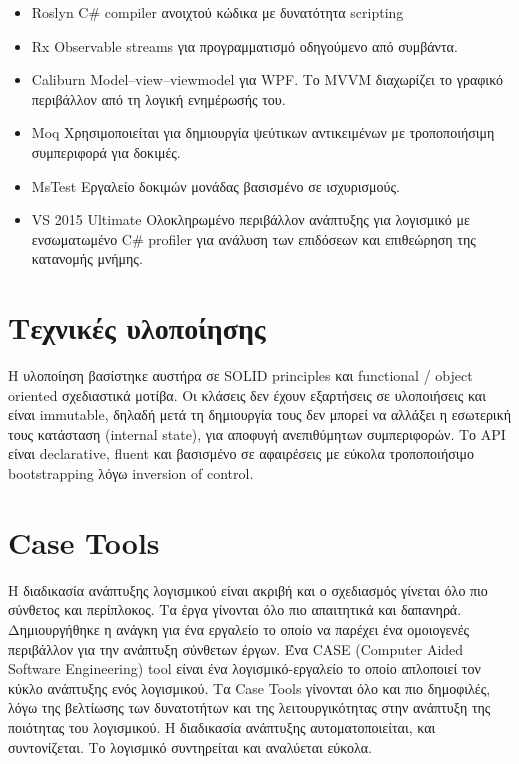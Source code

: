 \begin{itemize}
	\item{Roslyn} C\# compiler ανοιχτού κώδικα με δυνατότητα scripting
	\item{Rx} Observable streams για προγραμματισμό οδηγούμενο από συμβάντα.
	\item{Caliburn} Model–view–viewmodel για WPF. Το MVVM διαχωρίζει το γραφικό περιβάλλον από τη λογική ενημέρωσής του.
	\item{Moq} Χρησιμοποιείται για δημιουργία ψεύτικων αντικειμένων με τροποποιήσιμη συμπεριφορά για δοκιμές.
	\item{MsTest} Εργαλείο δοκιμών μονάδας βασισμένο σε ισχυρισμούς.
	\item{VS 2015 Ultimate} Ολοκληρωμένο περιβάλλον ανάπτυξης για λογισμικό με ενσωματωμένο C\# profiler για ανάλυση των επιδόσεων και επιθεώρηση της κατανομής μνήμης.
\end{itemize}

\section{Τεχνικές υλοποίησης}
Η υλοποίηση βασίστηκε αυστήρα σε SOLID principles και functional / object oriented σχεδιαστικά μοτίβα. Οι κλάσεις δεν έχουν εξαρτήσεις σε υλοποιήσεις και είναι immutable, δηλαδή μετά τη δημιουργία τους δεν μπορεί να αλλάξει η εσωτερική τους κατάσταση (internal state), για αποφυγή ανεπιθύμητων συμπεριφορών. Το API είναι declarative, fluent και βασισμένο σε αφαιρέσεις με εύκολα τροποποιήσιμο bootstrapping λόγω inversion of control.

\section{Case Tools}
Η διαδικασία ανάπτυξης λογισμικού είναι ακριβή και ο σχεδιασμός γίνεται όλο πιο σύνθετος και περίπλοκος. Τα έργα γίνονται όλο πιο απαιτητικά και δαπανηρά. Δημιουργήθηκε η ανάγκη για ένα εργαλείο το οποίο να παρέχει ένα ομοιογενές περιβάλλον για την ανάπτυξη σύνθετων έργων. 
Ένα CASE (Computer Aided Software Engineering) tool είναι ένα λογισμικό-εργαλείο το οποίο απλοποιεί τον κύκλο ανάπτυξης ενός λογισμικού. Τα Case Tools γίνονται όλο και πιο δημοφιλές, λόγω της βελτίωσης των δυνατοτήτων και της λειτουργικότητας στην ανάπτυξη της ποιότητας του λογισμικού. Η διαδικασία ανάπτυξης αυτοματοποιείται, και συντονίζεται. Το λογισμικό συντηρείται και αναλύεται εύκολα. 

